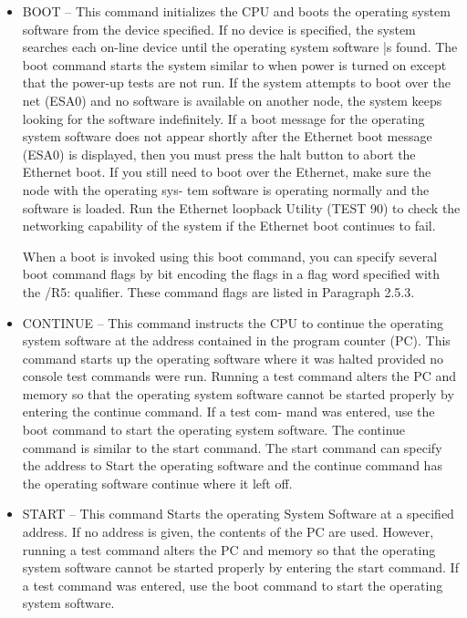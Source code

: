 \documentclass{decsectional}
\begin{document}
\begin{itemize}
\item BOOT -- This command initializes the CPU and boots the operating 
system software from the device specified. If no device is specified, the
system searches each on-line device until the operating system software
|s found. The boot command starts the system similar to when power
is turned on except that the power-up tests are not run. If the system
attempts to boot over the net (ESA0) and no software is available on
another node, the system keeps looking for the software indefinitely.
If a boot message for the operating system software does not appear
shortly after the Ethernet boot message (ESA0) is displayed, then you
must press the halt button to abort the Ethernet boot. If you still need
to boot over the Ethernet, make sure the node with the operating sys-
tem software is operating normally and the software is loaded. Run the
Ethernet loopback Utility (TEST 90) to check the networking capability
of the system if the Ethernet boot continues to fail.

When a boot is invoked using this boot command, you can specify
several boot command flags by bit encoding the flags in a flag word
specified with the /R5: qualifier. These command flags are listed in
Paragraph 2.5.3.

\item CONTINUE -- This command instructs the CPU to continue the 
operating system software at the address contained in the program counter
(PC). This command starts up the operating software where it was halted
provided no console test commands were run. Running a test command
alters the PC and memory so that the operating system software cannot
be started properly by entering the continue command. If a test com-
mand was entered, use the boot command to start the operating system
software. The continue command is similar to the start command. The
start command can specify the address to Start the operating software
and the continue command has the operating software continue where
it left off.

\item START -- This command Starts the operating System Software at a 
specified address. If no address is given, the contents of the PC are used.
However, running a test command alters the PC and memory so that the
operating system software cannot be started properly by entering the
start command. If a test command was entered, use the boot command
to start the operating system software.

\end{itemize}
\end{document}
